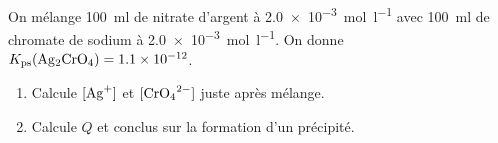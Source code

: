 \documentclass[11pt,a4paper]{article}
\begin{document}
\begin{exo}
On mélange \qty{100}{\milli\litre} de nitrate d'argent  à \qty{2.0e-3}{\mole\per\litre} avec
\qty{100}{\milli\litre} de chromate de sodium  à \qty{2.0e-3}{\mole\per\litre}. On donne
$K_{\mathrm{ps}}(\ce{Ag2CrO4})=\num{1.1e-12}$.
\begin{enumerate}[label=\alph*)]
  \item Calcule $[\ce{Ag+}]$ et $[\ce{CrO4^{2-}}]$ juste après mélange.
  \item Calcule $Q$ et conclus sur la formation d'un précipité.
\end{enumerate}
\end{exo}
\end{document}
